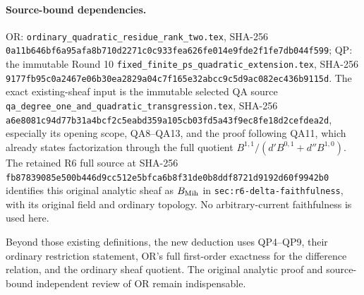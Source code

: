 \paragraph{Source-bound dependencies.}
OR: \texttt{ordinary\_quadratic\_residue\_rank\_two.tex}, SHA-256
\texttt{0a11b646bf6a95afa8b710d2271c0c933fea626fe014e9fde2f1fe7db044f599};
QP: the immutable Round 10
\texttt{fixed\_finite\_ps\_quadratic\_extension.tex}, SHA-256
\texttt{9177fb95c0a2467e06b30ea2829a04c7f165e32abcc9c5d9ac082ec436b9115d}.
The exact existing-sheaf input is the immutable selected QA source
\texttt{qa\_degree\_one\_and\_quadratic\_transgression.tex},
SHA-256
\texttt{a6e8081c94d77b31a4bcf2c5eabd359a105cb03fd5a43f9ec8fe18d2cefdea2d},
especially its opening scope, QA8--QA13, and the proof following
QA11, which already states factorization through the full quotient
\(B^{1,1}/(d'B^{0,1}+d''B^{1,0})\).  The retained R6 full
source at SHA-256
\texttt{fb87839085e500b446d9cc512e5bfca6b8f31de0b8ddf8721d9192d60f9942b0}
identifies this original analytic sheaf as \(B_{\rm Mih}\) in
\texttt{sec:r6-delta-faithfulness}, with its original field and
ordinary topology.  No arbitrary-current faithfulness is used here.

Beyond those existing definitions, the new deduction uses
QP4--QP9, their ordinary restriction statement, OR's full
first-order exactness for the difference relation, and the
ordinary sheaf quotient.  The original analytic proof and
source-bound independent review of OR remain indispensable.
